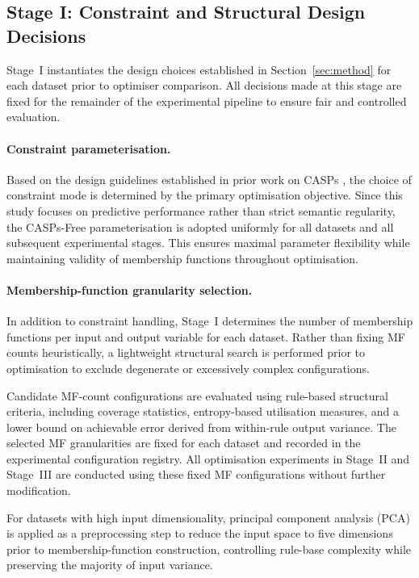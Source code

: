 \documentclass[conference]{IEEEtran}
\begin{document}
\subsection{Stage I: Constraint and Structural Design Decisions}

Stage~I instantiates the design choices established in
Section~\ref{sec:method} for each dataset prior to optimiser comparison.
All decisions made at this stage are fixed for the remainder of the experimental
pipeline to ensure fair and controlled evaluation.

\paragraph*{Constraint parameterisation.}
Based on the design guidelines established in prior work on CASPs
\cite{chen2025casp}, the choice of constraint mode is determined by the primary
optimisation objective.
Since this study focuses on predictive performance rather than strict semantic
regularity, the CASPs-Free parameterisation is adopted uniformly for all
datasets and all subsequent experimental stages.
This ensures maximal parameter flexibility while maintaining validity of
membership functions throughout optimisation.

\paragraph*{Membership-function granularity selection.}
In addition to constraint handling, Stage~I determines the number of membership
functions per input and output variable for each dataset.
Rather than fixing MF counts heuristically, a lightweight structural search is
performed prior to optimisation to exclude degenerate or excessively complex
configurations.

Candidate MF-count configurations are evaluated using rule-based structural
criteria, including coverage statistics, entropy-based utilisation measures,
and a lower bound on achievable error derived from within-rule output variance.
The selected MF granularities are fixed for each dataset and recorded in the
experimental configuration registry.
All optimisation experiments in Stage~II and Stage~III are conducted using these
fixed MF configurations without further modification.

For datasets with high input dimensionality, principal component analysis (PCA)
is applied as a preprocessing step to reduce the input space to five dimensions
prior to membership-function construction, controlling rule-base complexity
while preserving the majority of input variance.
\end{document}
